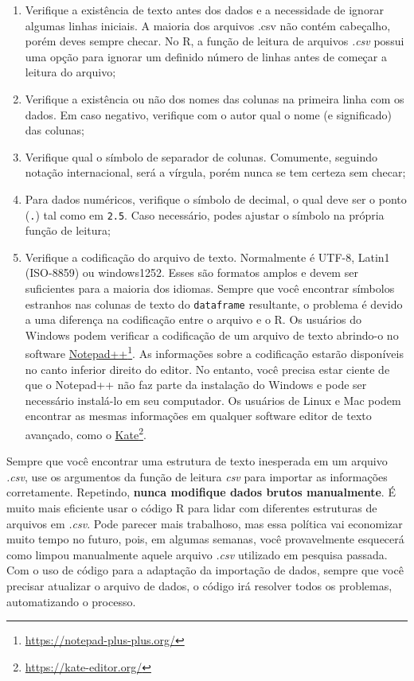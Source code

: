 \documentclass[
  11pt,
]{book}
\newenvironment{rmdimportant}
{\begin{importantblock}

	} {\end{importantblock}}
\begin{document}
\begin{enumerate}
\def\labelenumi{\arabic{enumi})}
\item
  Verifique a existência de texto antes dos dados e a necessidade de ignorar algumas linhas iniciais. A maioria dos arquivos .csv não contém cabeçalho, porém deves sempre checar. No R, a função de leitura de arquivos \emph{.csv} possui uma opção para ignorar um definido número de linhas antes de começar a leitura do arquivo;
\item
  Verifique a existência ou não dos nomes das colunas na primeira linha com os dados. Em caso negativo, verifique com o autor qual o nome (e significado) das colunas;
\item
  Verifique qual o símbolo de separador de colunas. Comumente, seguindo notação internacional, será a vírgula, porém nunca se tem certeza sem checar;
\item
  Para dados numéricos, verifique o símbolo de decimal, o qual deve ser o ponto (\texttt{.}) tal como em \texttt{2.5}. Caso necessário, podes ajustar o símbolo na própria função de leitura;
\item
  Verifique a codificação do arquivo de texto. Normalmente é UTF-8, Latin1 (ISO-8859) ou windows1252. Esses são formatos amplos e devem ser suficientes para a maioria dos idiomas. Sempre que você encontrar símbolos estranhos nas colunas de texto do \texttt{dataframe} resultante, o problema é devido a uma diferença na codificação entre o arquivo e o R. Os usuários do Windows podem verificar a codificação de um arquivo de texto abrindo-o no software \href{https://notepad-plus-plus.org/}{Notepad++}\footnote{\url{https://notepad-plus-plus.org/}}. As informações sobre a codificação estarão disponíveis no canto inferior direito do editor. No entanto, você precisa estar ciente de que o Notepad++ não faz parte da instalação do Windows e pode ser necessário instalá-lo em seu computador. Os usuários de Linux e Mac podem encontrar as mesmas informações em qualquer software editor de texto avançado, como o \href{https://kate-editor.org/}{Kate}\footnote{\url{https://kate-editor.org/}}.
\end{enumerate}

\begin{rmdimportant}
Sempre que você encontrar uma estrutura de texto inesperada em um
arquivo \emph{.csv}, use os argumentos da função de leitura \emph{csv}
para importar as informações corretamente. Repetindo, \textbf{nunca
modifique dados brutos manualmente}. É muito mais eficiente usar o
código R para lidar com diferentes estruturas de arquivos em
\emph{.csv}. Pode parecer mais trabalhoso, mas essa política vai
economizar muito tempo no futuro, pois, em algumas semanas, você
provavelmente esquecerá como limpou manualmente aquele arquivo
\emph{.csv} utilizado em pesquisa passada. Com o uso de código para a
adaptação da importação de dados, sempre que você precisar atualizar o
arquivo de dados, o código irá resolver todos os problemas,
automatizando o processo.
\end{rmdimportant}
\end{document}
